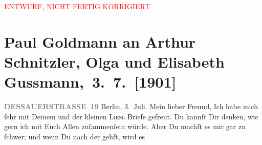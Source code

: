
\begin{center}
            \textcolor{red}{ENTWURF, NICHT FERTIG KORRIGIERT}
                      \end{center}
            
         
         \renewcommand{\erwaehntePersonen}{Personen: Alfred Kerr, Olga Schnitzler, Elisabeth Steinrück}
         \renewcommand{\erwaehnteInstitutionen}{Institutionen: Südbahn-Gesellschaft}
         \renewcommand{\erwaehnteOrte}{Orte: Berlin, Dessauer Straße, Kärnten, Schweiz, St. Anton am Arlberg, Südtirol, Tirol, Wörthersee, Österreich}
         \renewcommand{\erwaehnteWerke}{}
               \section[Paul Goldmann an Arthur Schnitzler, Olga und Elisabeth Gussmann, 3. 7. {[}1901{]}]{ Paul Goldmann an Arthur Schnitzler, Olga und Elisabeth
               Gussmann, 3. 7. {[}1901{]}}\nopagebreak{}\rehead{ }\begin{ledgroupsized}[t]{13cm}\normalsize\beginnumbering \toendnotes[C]{\smallbreak\pagebreak[2]} 
\toendnotes[C]{\smallbreak}\pstart
           \noindent{}\raggedleft{}{\pb}\textcolor{gray}{\textbf{DESSAUERSTRASSE 19}}\pend
           \pstart
           Berlin, 3. Juli.\pend
           \pstart\center{}Mein lieber Freund,\pend\pstart
           Ich habe mich ſehr mit Deinem und der kleinen \textsc{Liesl} Briefe gefreut.\pend
           \pstart
           Du kannſt Dir denken, wie gern ich mit Euch Allen zuſammenſein würde. Aber Du machſt
               es mir gar zu  ſchwer; und wenn Du nach der \label{K_L03071-1v}\label{K_L03071-1h} gehſt, wird es

\end{ledgroupsized}
